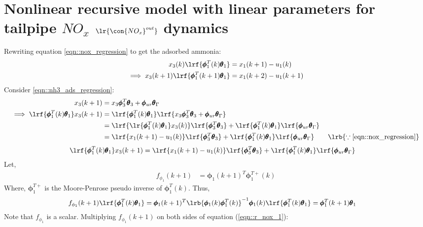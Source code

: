\newpage
\section{Nonlinear recursive model with linear parameters for tailpipe $NO_x$ $\lr{\con{NO_x}^{out}}$ dynamics}
Rewriting equation \ref{eqn::nox_regression} to get the adsorbed ammonia:
\begin{align*}
        x_3(k) \lrf{\pmb \phi_1^T(k) \pmb \theta_1} &= {x_1(k+1) - u_1(k)}\\
        \implies x_3(k+1) \lrf{\pmb \phi_1^T(k+1) \pmb \theta_1} &= {x_1(k+2) - u_1(k+1)}
\end{align*}
Consider \ref{eqn::nh3_ads_regression}:
\begin{align*}
     x_3(k+1) &= x_3 \pmb \phi_3^T \pmb \theta_3 + \pmb \phi_{ur} \pmb \theta_\Gamma\\
     \implies \lrf{\pmb \phi_1^T(k) \pmb \theta_1} x_3(k+1) &= \lrf{\pmb \phi_1^T(k) \pmb \theta_1} \lrf{x_3 \pmb \phi_3^T \pmb \theta_3 + \pmb \phi_{ur} \pmb \theta_\Gamma}\\
     &= \lrf{\lr{\pmb \phi_1^T(k) \pmb \theta_1}x_3(k)} \lrf{\pmb \phi_3^T \pmb \theta_3}
     + \lrf{\pmb \phi_1^T(k) \pmb \theta_1} \lrf{\pmb \phi_{ur} \pmb \theta_\Gamma}\\
     &= \lrf{{x_1(k+1) - u_1(k)}} \lrf{\pmb \phi_3^T \pmb \theta_3}
     + \lrf{\pmb \phi_1^T(k) \pmb \theta_1} \lrf{\pmb \phi_{ur} \pmb \theta_\Gamma}  \qquad \lrb{\because \ref{eqn::nox_regression}}
\end{align*}
\begin{align}
        \lrf{\pmb \phi_1^T(k) \pmb \theta_1} x_3(k+1)
        &= \lrf{{x_1(k+1) - u_1(k)}} \lrf{\pmb \phi_3^T \pmb \theta_3} + \lrf{\pmb \phi_1^T(k) \pmb \theta_1} \lrf{\pmb \phi_{ur} \pmb \theta_\Gamma}
        \label{eqn::r_nox_1}
\end{align}
Let,
\begin{align}
        f_{\phi_1}(k+1) &= \pmb \phi_1(k+1)^T \pmb \phi_1^{T+}(k)
        \label{eqn::f_phi_1}
\end{align}
Where, $\pmb \phi_1^{T+}$ is the Moore-Penrose pseudo inverse of $\pmb \phi_1^T(k)$. Thus,
\begin{align}
        f_{\phi_1}(k+1) \lrf{\pmb \phi_1^T(k) \pmb \theta_1} &= \pmb \phi_1(k+1)^T \lrb{\pmb \phi_1(k) \pmb \phi_1^T(k)}^{-1} \pmb \phi_1(k) \lrf{\pmb \phi_1^T(k) \pmb \theta_1}
        = \pmb \phi_1^T(k+1) \pmb \theta_1
        \label{eqn::f_phi_prop}
\end{align}
Note that $f_{\phi_1}$ is a scalar. Multiplying $f_{\phi_1}(k+1)$ on both sides of equation (\ref{eqn::r_nox_1}):
